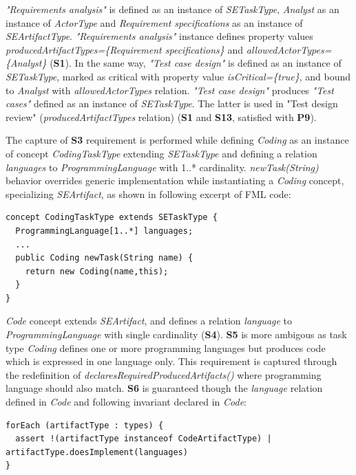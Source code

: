 \textit{"Requirements analysis"} is defined as an instance of \textit{SETaskType}, \textit{Analyst} as an instance of \textit{ActorType} and \textit{Requirement specifications} as an instance of \textit{SEArtifactType}. \textit{"Requirements analysis"} instance defines property values \textit{producedArtifactTypes=\{Requirement specifications\}} and \textit{allowedActorTypes=\{Analyst\}} (\textbf{S1}). In the same way, \textit{"Test case design"} is defined as an instance of \textit{SETaskType}, marked as critical with property value \textit{isCritical=\{true\}}, and bound to \textit{Analyst} with \textit{allowedActorTypes} relation. \textit{"Test case design"} produces \textit{"Test cases"} defined as an instance of \textit{SETaskType}. The latter is used in "Test design review" (\textit{producedArtifactTypes} relation) (\textbf{S1} and \textbf{S13}, satisfied with \textbf{P9}). 

The capture of \textbf{S3} requirement is performed while defining \textit{Coding} as an instance of concept \textit{CodingTaskType} extending \textit{SETaskType} and defining a relation \textit{languages} to \textit{ProgrammingLanguage} with 1..* cardinality. \textit{newTask(String)} behavior overrides generic implementation while instantiating a \textit{Coding} concept, specializing \textit{SEArtifact}, as shown in following excerpt of FML code:

\begin{lstlisting}
concept CodingTaskType extends SETaskType {
  ProgrammingLanguage[1..*] languages;
  ...
  public Coding newTask(String name) { 
    return new Coding(name,this); 
  }
}    
\end{lstlisting}

\textit{Code} concept extends \textit{SEArtifact}, and defines a relation \textit{language} to \textit{ProgrammingLanguage} with single cardinality (\textbf{S4}). \textbf{S5} is more ambigous as task type \textit{Coding} defines one or more programming languages but produces code which is expressed in one language only. This requirement is captured through the redefinition of \textit{declaresRequiredProducedArtifacts()} where programming language should also match. 
\textbf{S6} is guaranteed though the \textit{language} relation defined in \textit{Code} and following invariant declared in \textit{Code}:  

\begin{lstlisting}
forEach (artifactType : types) {
  assert !(artifactType instanceof CodeArtifactType) | artifactType.doesImplement(languages)
}
\end{lstlisting}

